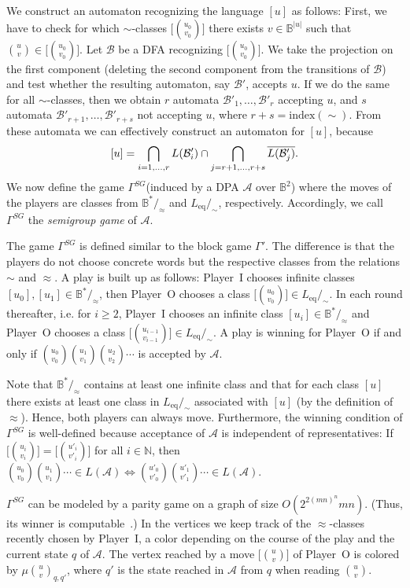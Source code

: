 \documentclass[fleqn,envcountsame]{LMCS}
\newcommand{\aut}[1]{\ensuremath{\mathcal{#1}}}
\newcommand{\pI}{Player~I\xspace}
\newcommand{\pO}{Player~O\xspace}
\newcommand{\Leq}{\ensuremath{L_{\mathrm{eq}}}\xspace}
\newcommand{\GSG}{\ensuremath{\Gamma^{SG}}\xspace}
\newcommand{\Gpempty}{\ensuremath{\Gamma'}\xspace}
\newcommand{\LA}{\ensuremath{L(\aut{A})}\xspace}
\newcommand{\Nat}{\ensuremath{\mathbb{N}}\xspace}
\newcommand{\B}{\ensuremath{\mathbb{B}}\xspace}
\newcommand{\Bst}{\ensuremath{\mathbb{B}^*}\xspace}
\newcommand{\Bsq}{\ensuremath{\mathbb{B}^2}\xspace}
\newcommand{\ie}{i.e.\xspace}
\newcommand{\Index}{\mathrm{index}}
\let\obinom\binom
\renewcommand\binom[2]{
  \Big( { {{#1}} \atop {{#2}} } \Big)
}
\begin{document}
\proof
We construct an automaton recognizing the language $[u]$ as follows:
First, we have to check for which $\sim$-classes $\big[\obinom{u_0}{v_0}\big]$
there exists $v\in\B^{|u|}$ such that
$\obinom{u}{v} \in \big[ \obinom{u_0}{v_0} \big]$. Let \aut{B} be a DFA
recognizing $\big[\obinom{u_0}{v_0} \big]$. We take the projection on the
first component (deleting the second component from the transitions of \aut{B})
and test whether the resulting automaton, say $\aut{B}'$, accepts $u$.
If we do the same for all $\sim$-classes,
then we obtain $r$ automata $\aut{B}'_1,\ldots,\aut{B}'_r$ accepting
$u$, and $s$ automata $\aut{B}'_{r+1},\ldots,\aut{B}'_{r+s}$ not accepting $u$,
where $r+s = \Index(\sim)$. From these automata we can effectively construct
an automaton for $[u]$, because \label{pageref:definition_L_A_u}
\[ [u] = \bigcap\limits_{i=1,\ldots,r}L(\aut{B}'_i) \cap
         \bigcap\limits_{j=r+1,\ldots,r+s}\overline{L(\aut{B}'_j)}.
\rlap{\hbox to 215 pt{\hfill\qEd}}
\]
We now define the game \GSG (induced by a DPA \aut{A} over \Bsq) where the moves of
the players are classes from $\Bst/_{\approx}$ and $\Leq/_{\sim}$, respectively.
Accordingly, we call \GSG the \emph{semigroup game} of \aut{A}.

The game \GSG is defined similar to the block game \Gpempty.
The difference is that the players do not choose concrete words but the
respective classes from the relations $\sim$ and $\approx$. A play is
built up as follows: \pI chooses infinite classes
$[u_0],[u_1]\in\Bst/_{\approx}$, then \pO chooses a class
$\big[\obinom{u_0}{v_0}\big] \in \Leq/_{\sim}$. In each round thereafter,
\ie for $i\geq2$, \pI chooses an infinite class
$[u_i]\in\Bst/_{\approx}$ and \pO chooses a class
$\big[\obinom{u_{i-1}}{v_{i-1}}\big]\in\Leq/_{\sim}$.
A play is winning for \pO if and only if
$\obinom{u_0}{v_0}\obinom{u_1}{v_1}\obinom{u_2}{v_2}\cdots$ is accepted
by \aut{A}.

Note that $\Bst/_{\approx}$ contains at least one infinite class and that
for each class $[u]$ there exists at least one class in $\Leq/_{\sim}$
associated with $[u]$ (by the definition of~$\approx$).
Hence, both players can always move.
Furthermore, the winning condition of \GSG is well-defined
because acceptance of \aut{A} is independent of representatives:
If $\big[\obinom{u_i}{v_i}\big] = \big[\obinom{u'_i}{v'_i}\big]$ for all $i\in\Nat$, then
$\obinom{u_0}{v_0}\obinom{u_1}{v_1}\cdots\in\LA\iff\obinom{u'_0}{v'_0}\obinom{u'_1}{v'_1}\cdots\in\LA$.

\GSG\label{pageref:size_of_GSG} can be modeled by a parity game on a graph of size $O(2^{2(mn)^n}mn)$.
(Thus, its winner is computable~\cite{GTW02AutLogInfGam}.)
In the vertices we keep track of the $\approx$-classes recently chosen by \pI,
a color depending on the course of the play and
the current state $q$ of \aut{A}. The vertex reached by
a move $\big[\obinom{u}{v}\big]$ of \pO is colored by $\mu\obinom{u}{v}_{q,q'}$,
where $q'$ is the state reached in \aut{A} from $q$ when reading $\obinom{u}{v}$.
\end{document}
